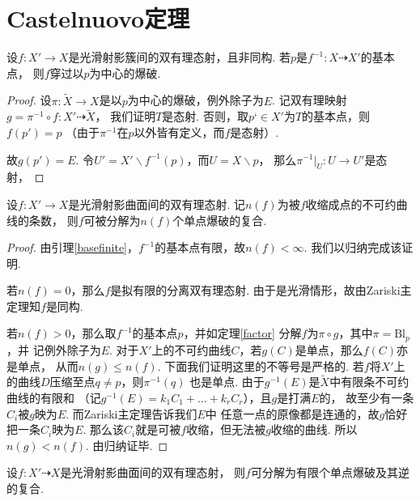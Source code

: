 \section{Castelnuovo定理}
\begin{theorem}\label{factor}
    设$f\colon X' \to X$是光滑射影簇间的双有理态射，且非同构.
    若$p$是$f^{-1}\colon X \dashrightarrow X'$的基本点，
    则$f$穿过以$p$为中心的爆破.
\end{theorem}
\begin{proof}
    设$\pi\colon \tilde{X} \to X$是以$p$为中心的爆破，例外除子为$E$.
    记双有理映射$g = \pi^{-1} \circ f:X' \dashrightarrow \tilde{X}$，
    我们证明$T$是态射.
    否则，取$p‘ \in X'$为$T$的基本点，则$f(p') = p$
    （由于$\pi^{-1}$在$p$以外皆有定义，而$f$是态射）. 

    故$g(p') = E$.
    令$U' = X' \backslash f^{-1}(p)$，而$U = X \backslash p$，
    那么$\pi^{-1}|_{U}:U \to U'$是态射，
\end{proof}

\begin{corollary}
    设$f:X' \to X$是光滑射影曲面间的双有理态射.
    记$n(f)$为被$f$收缩成点的不可约曲线的条数，
    则$f$可被分解为$n(f)$个单点爆破的复合.
\end{corollary}
\begin{proof}
    由引理\ref{basefinite}，$f^{-1}$的基本点有限，故$n(f) < \infty$.
    我们以归纳完成该证明.

    若$n(f) = 0$，那么$f$是拟有限的分离双有理态射. 
    由于是光滑情形，故由Zariski主定理知$f$是同构.

    若$n(f) > 0$，那么取$f^{-1}$的基本点$p$，并如定理\ref{factor}
    分解$f$为$\pi \circ g$，其中$\pi = \mathrm{Bl}_{p}$，并
    记例外除子为$E$. 
    对于$X'$上的不可约曲线$C$，若$g(C)$是单点，那么$f(C)$亦是单点，
    从而$n(g) \leq n(f)$. 下面我们证明这里的不等号是严格的.
    若$f$将$X'$上的曲线$D$压缩至点$q \neq p$，则$\pi^{-1}(q)$
    也是单点. 由于$g^{-1}(E)$是$\tilde{X}$中有限条不可约曲线的有限和
    （记$g^{-1}(E) = k_{1}C_{1} + \dots + k_{r}C_{r}$），且$g$是打满$E$的，
    故至少有一条$C_{i}$被$g$映为$E$. 而Zariski主定理告诉我们$E$中
    任意一点的原像都是连通的，故$g$恰好把一条$C_{i}$映为$E$.
    那么该$C_{i}$就是可被$f$收缩，但无法被$g$收缩的曲线. 所以$n(g) < n(f)$.
    由归纳证毕.
\end{proof}

\begin{theorem}
    设$f:X' \dashrightarrow X$是光滑射影曲面间的双有理态射，
    则$f$可分解为有限个单点爆破及其逆的复合.    
\end{theorem}

